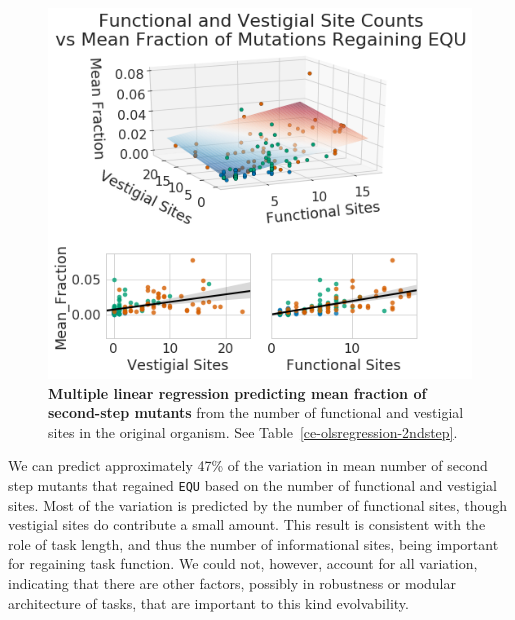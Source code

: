 \documentclass[10pt,letterpaper]{article}
\begin{document}
	\begin{figure}[!h] %
	\includegraphics[width=0.75\columnwidth]{figures/CE/CCE_2step_vs_func_vest_sites.png}
	\caption{\textbf{Multiple linear regression predicting mean fraction of second-step mutants} from the number of functional and vestigial sites in the original organism. See Table~\ref{ce-olsregression-2ndstep}.
	}\label{fig:CCE_2step_vs_func_vest_sites}
	\end{figure}

We can predict approximately 47\% of the variation in mean number of second step mutants that regained \texttt{EQU} based on the number of functional and vestigial sites. Most of the variation is predicted by the number of functional sites, though vestigial sites do contribute a small amount. This result is consistent with the role of task length, and thus the number of informational sites, being important for regaining task function. We could not, however, account for all variation, indicating that there are other factors, possibly in robustness or modular architecture of tasks, that are important to this kind evolvability.
\end{document}
